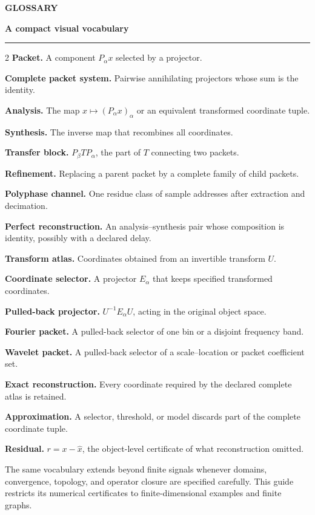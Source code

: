 \documentclass[10pt]{article}
\newcommand{\PageTitle}[2][]{%
  {\color{Muted}\fontsize{9.5}{11}\selectfont\bfseries #1}\par
  \vspace{0.02in}
  {\color{Ink}\fontsize{20}{23}\selectfont\bfseries #2}\par
  \vspace{0.07in}
  {\color{Blue}\rule{\linewidth}{1.15pt}}\par
  \vspace{0.08in}
}
\newcommand{\Callout}[2][PaleBlue]{%
  \noindent\colorbox{#1}{\parbox{0.965\linewidth}{\vspace{2pt}\small\RaggedRight #2\par\vspace{2pt}}}
}
\begin{document}
\clearpage
\PageTitle[GLOSSARY]{A compact visual vocabulary}
\begin{multicols}{2}
\textbf{Packet.} A component $P_\alpha x$ selected by a projector.\par
\textbf{Complete packet system.} Pairwise annihilating projectors whose sum is the identity.\par
\textbf{Analysis.} The map $x\mapsto(P_\alpha x)_\alpha$ or an equivalent transformed coordinate tuple.\par
\textbf{Synthesis.} The inverse map that recombines all coordinates.\par
\textbf{Transfer block.} $P_\beta TP_\alpha$, the part of $T$ connecting two packets.\par
\textbf{Refinement.} Replacing a parent packet by a complete family of child packets.\par
\textbf{Polyphase channel.} One residue class of sample addresses after extraction and decimation.\par
\textbf{Perfect reconstruction.} An analysis--synthesis pair whose composition is identity, possibly with a declared delay.\par
\columnbreak
\textbf{Transform atlas.} Coordinates obtained from an invertible transform $U$.\par
\textbf{Coordinate selector.} A projector $E_\alpha$ that keeps specified transformed coordinates.\par
\textbf{Pulled-back projector.} $U^{-1}E_\alpha U$, acting in the original object space.\par
\textbf{Fourier packet.} A pulled-back selector of one bin or a disjoint frequency band.\par
\textbf{Wavelet packet.} A pulled-back selector of a scale--location or packet coefficient set.\par
\textbf{Exact reconstruction.} Every coordinate required by the declared complete atlas is retained.\par
\textbf{Approximation.} A selector, threshold, or model discards part of the complete coordinate tuple.\par
\textbf{Residual.} $r=x-\widehat x$, the object-level certificate of what reconstruction omitted.\par
\end{multicols}
\vfill
\Callout[PaleTeal]{The same vocabulary extends beyond finite signals whenever domains, convergence, topology, and operator closure are specified carefully. This guide restricts its numerical certificates to finite-dimensional examples and finite graphs.}
\end{document}
